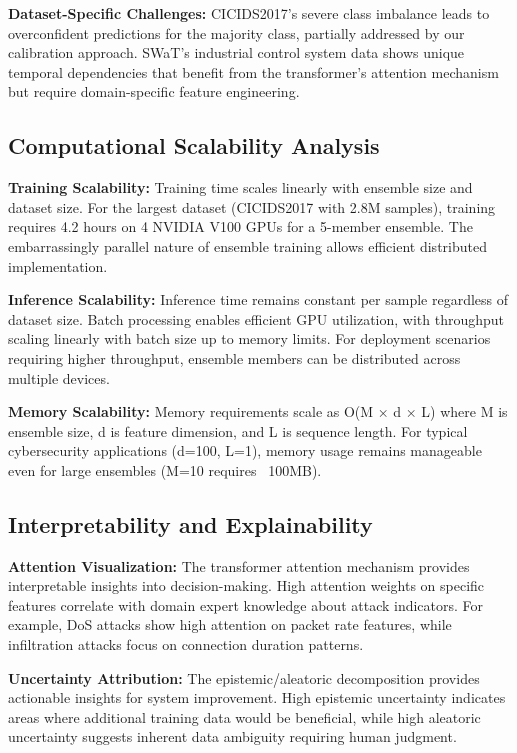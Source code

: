 \documentclass[journal]{IEEEtran}
\begin{document}
\textbf{Dataset-Specific Challenges:} CICIDS2017's severe class imbalance leads to overconfident predictions for the majority class, partially addressed by our calibration approach. SWaT's industrial control system data shows unique temporal dependencies that benefit from the transformer's attention mechanism but require domain-specific feature engineering.

\subsection{Computational Scalability Analysis}

\textbf{Training Scalability:} Training time scales linearly with ensemble size and dataset size. For the largest dataset (CICIDS2017 with 2.8M samples), training requires 4.2 hours on 4 NVIDIA V100 GPUs for a 5-member ensemble. The embarrassingly parallel nature of ensemble training allows efficient distributed implementation.

\textbf{Inference Scalability:} Inference time remains constant per sample regardless of dataset size. Batch processing enables efficient GPU utilization, with throughput scaling linearly with batch size up to memory limits. For deployment scenarios requiring higher throughput, ensemble members can be distributed across multiple devices.

\textbf{Memory Scalability:} Memory requirements scale as O(M × d × L) where M is ensemble size, d is feature dimension, and L is sequence length. For typical cybersecurity applications (d=100, L=1), memory usage remains manageable even for large ensembles (M=10 requires ~100MB).

\subsection{Interpretability and Explainability}

\textbf{Attention Visualization:} The transformer attention mechanism provides interpretable insights into decision-making. High attention weights on specific features correlate with domain expert knowledge about attack indicators. For example, DoS attacks show high attention on packet rate features, while infiltration attacks focus on connection duration patterns.

\textbf{Uncertainty Attribution:} The epistemic/aleatoric decomposition provides actionable insights for system improvement. High epistemic uncertainty indicates areas where additional training data would be beneficial, while high aleatoric uncertainty suggests inherent data ambiguity requiring human judgment.
\end{document}
